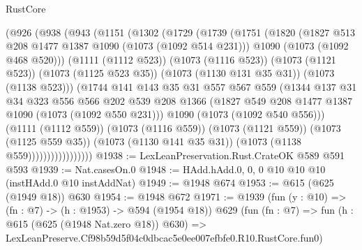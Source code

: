 \begin{lexlean}{RustCore}
\begin{coremodule}
                  (@926
                    (@938
                      (@943
                        (@1151
                          (@1302
                            (@1729
                              (@1739
                                (@1751
                                  (@1820
                                    (@1827 @513 @208 @1477 @1387 @1090 (@1073 (@1092 @514 @231)))
                                    @1090
                                    (@1073 (@1092 @468 @520)))
                                  (@1111 (@1112 @523))
                                  (@1073 (@1116 @523))
                                  (@1073 (@1121 @523))
                                  (@1073 (@1125 @523 @35))
                                  (@1073 (@1130 @131 @35 @31))
                                  (@1073 (@1138 @523)))
                                (@1744
                                  @141
                                  @143
                                  @35
                                  @31
                                  @557
                                  @567
                                  @559
                                  (@1344
                                    @137
                                    @31
                                    @34
                                    @323
                                    @556
                                    @566
                                    @202
                                    @539
                                    @208
                                    @1366
                                    (@1827 @549 @208 @1477 @1387 @1090 (@1073 (@1092 @550 @231)))
                                    @1090
                                    (@1073 (@1092 @540 @556)))
                                  (@1111 (@1112 @559))
                                  (@1073 (@1116 @559))
                                  (@1073 (@1121 @559))
                                  (@1073 (@1125 @559 @35))
                                  (@1073 (@1130 @141 @35 @31))
                                  (@1073 (@1138 @559)))))))))))))))))
@1938 := LexLeanPreservation.Rust.CrateOK @589 @591 @593
@1939 := Nat.casesOn.{0}
@1948 := HAdd.hAdd.{0, 0, 0} @10 @10 @10 (instHAdd.{0} @10 instAddNat)
@1949 := @1948 @674
@1953 := @615 (@625 (@1949 @18)) @630
@1954 := @1948 @672
@1971 := @1939
    (fun (y : @10) => (fn : @7) -> (h : @1953) -> @594 (@1954 @18))
    @629
    (fun (fn : @7) =>
    fun (h : @615 (@625 (@1948 Nat.zero @18)) @630) =>
    LexLeanPreserve.Cf98b59d5f04c0dbcac5e0ee007efbfe0.R10.RustCore.fun0)

\end{coremodule}
\end{lexlean}
